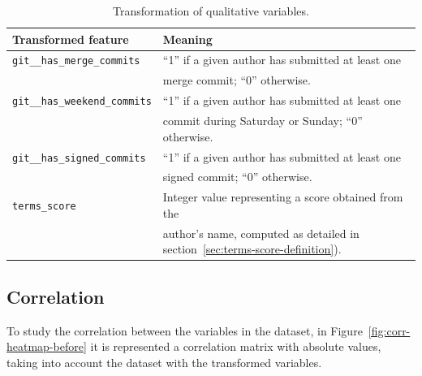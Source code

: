 \documentclass[a4paper, 12pt]{book}
\begin{document}
\begin{table}[htb]  %
 \renewcommand{\arraystretch}{1.2}  %
 \begin{center}
  \begin{tabular}{ l l }
    \toprule    %
    \textbf{Transformed feature} & \textbf{Meaning} \\
    \midrule
    \texttt{git\_\_has\_merge\_commits}   & ``1'' if a given author has submitted at least one\\
                                          & merge commit; ``0'' otherwise.\\
    \addlinespace
    \texttt{git\_\_has\_weekend\_commits} & ``1'' if a given author has submitted at least one\\                                          & commit during Saturday or Sunday; ``0'' otherwise.\\
    \addlinespace
    \texttt{git\_\_has\_signed\_commits}  & ``1'' if a given author has submitted at least one\\
                                          & signed commit; ``0'' otherwise.\\
    \addlinespace
    \texttt{terms\_score} & Integer value representing a score obtained from the\\
                          & author's name, computed as detailed in section~\ref{sec:terms-score-definition}).\\
    \bottomrule     %
  \end{tabular}
  \caption{Transformation of qualitative variables.}
  \label{table:transformation-qualitative}
 \end{center}
\end{table}


\subsection{Correlation}
\label{ssec:correlation}

To study the correlation between the variables in the dataset, in Figure~\ref{fig:corr-heatmap-before} it is represented a correlation matrix with absolute values, taking into account the dataset with the transformed variables. 
\end{document}
